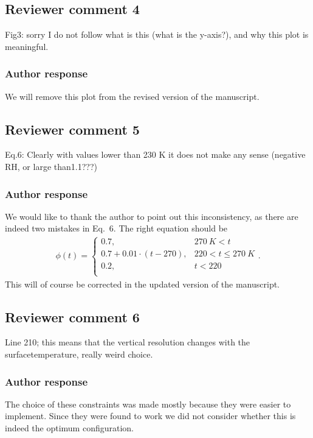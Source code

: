 \documentclass[11pt]{scrartcl}
\begin{document}
\subsection*{Reviewer comment 4}

Fig3: sorry I do not follow what is this (what is the y-axis?), and why this plot is meaningful.

\subsubsection*{Author response}

We will remove this plot from the revised version of the manuscript.


\subsection*{Reviewer comment 5}
Eq.6: Clearly with values lower than 230 K it does not make any sense (negative RH, or large than1.1???)

\subsubsection*{Author response}

We would like to thank the author to point out this inconsistency, as there are indeed two mistakes
in Eq.~6. The right equation should be
\begin{align}
\phi(t) = \begin{cases}
 0.7, & 270\ \unit{K} < t \\
 0.7 + 0.01 \cdot (t - 270), &220 < t \leq  270\ \unit{K} \\
 0.2,  & t < 220 \\
 \end{cases}.
\end{align}
This will of course be corrected in the updated version of the manuscript.

\subsection*{Reviewer comment 6}
Line 210; this means that the vertical resolution changes with the surfacetemperature, really weird choice.

\subsubsection*{Author response}

The choice of these constraints was made mostly because they were
easier to implement. Since they were found to work we did not consider
whether this is indeed the optimum configuration.
\end{document}

